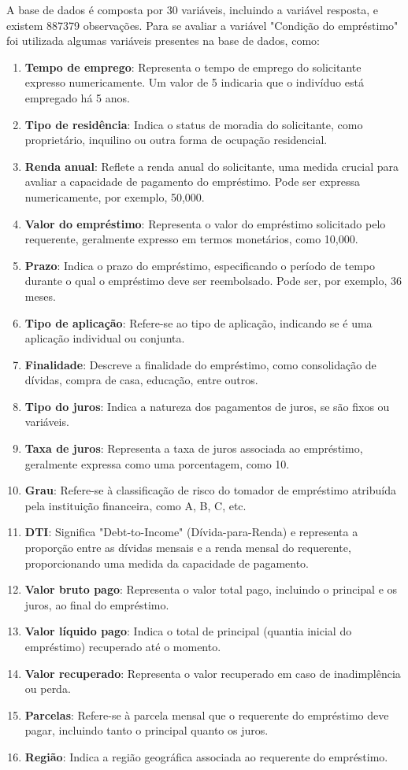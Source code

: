 A base de dados é composta por 30 variáveis, incluindo a variável resposta, e existem 887379 observações.
Para se avaliar a variável "Condição do empréstimo" foi utilizada algumas variáveis presentes na base de dados, como:

\begin{enumerate}
  \item \textbf{Tempo de emprego}: Representa o tempo de emprego do solicitante expresso numericamente. Um valor de 5 indicaria que o indivíduo está empregado há 5 anos.
  \item \textbf{Tipo de residência}: Indica o status de moradia do solicitante, como proprietário, inquilino ou outra forma de ocupação residencial.
  \item \textbf{Renda anual}: Reflete a renda anual do solicitante, uma medida crucial para avaliar a capacidade de pagamento do empréstimo. Pode ser expressa numericamente, por exemplo, 50,000.
  \item \textbf{Valor do empréstimo}: Representa o valor do empréstimo solicitado pelo requerente, geralmente expresso em termos monetários, como 10,000.
  \item \textbf{Prazo}: Indica o prazo do empréstimo, especificando o período de tempo durante o qual o empréstimo deve ser reembolsado. Pode ser, por exemplo, 36 meses.
  \item \textbf{Tipo de aplicação}: Refere-se ao tipo de aplicação, indicando se é uma aplicação individual ou conjunta.
  \item \textbf{Finalidade}: Descreve a finalidade do empréstimo, como consolidação de dívidas, compra de casa, educação, entre outros.
  \item \textbf{Tipo do juros}: Indica a natureza dos pagamentos de juros, se são fixos ou variáveis.
  \item \textbf{Taxa de juros}: Representa a taxa de juros associada ao empréstimo, geralmente expressa como uma porcentagem, como 10.
  \item \textbf{Grau}: Refere-se à classificação de risco do tomador de empréstimo atribuída pela instituição financeira, como A, B, C, etc.
  \item \textbf{DTI}: Significa "Debt-to-Income" (Dívida-para-Renda) e representa a proporção entre as dívidas mensais e a renda mensal do requerente, proporcionando uma medida da capacidade de pagamento.
  \item \textbf{Valor bruto pago}: Representa o valor total pago, incluindo o principal e os juros, ao final do empréstimo.
  \item \textbf{Valor líquido pago}: Indica o total de principal (quantia inicial do empréstimo) recuperado até o momento.
  \item \textbf{Valor recuperado}: Representa o valor recuperado em caso de inadimplência ou perda.
  \item \textbf{Parcelas}: Refere-se à parcela mensal que o requerente do empréstimo deve pagar, incluindo tanto o principal quanto os juros.
  \item \textbf{Região}: Indica a região geográfica associada ao requerente do empréstimo.
\end{enumerate}



